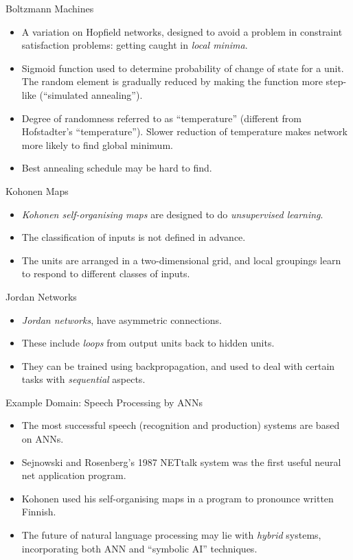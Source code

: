 \documentclass{article}
\begin{document}
\begin{slide}{}
{\Large Boltzmann Machines}
\begin{itemize}
\item A variation on Hopfield networks,
designed to avoid a problem in
constraint satisfaction problems: getting caught in {\em local 
minima}. 
\item Sigmoid function used to determine probability of change of
state for a unit. The random
element is gradually reduced by making the function more step-like
(``simulated annealing'').
\item Degree of randomness referred to as ``temperature'' (different
from Hofstadter's ``temperature''). Slower reduction of temperature
makes network more likely to find global minimum. 
\item Best annealing schedule may be hard to find.
\end{itemize}
\end{slide}

\begin{slide}{}
{\Large Kohonen Maps}
\begin{itemize}
\item {\em Kohonen self-organising maps} are designed to do {\em
unsupervised learning}.
\item The classification of inputs is not
defined in advance. 
\item The units are arranged in a two-dimensional grid,
and local groupings learn to respond to different classes of
inputs.
\end{itemize}
\end{slide}

\begin{slide}{}
{\Large Jordan Networks}
\begin{itemize}
\item {\em Jordan networks}, have asymmetric connections.
\item These
include {\em loops} from output units back to hidden units. 
\item They can
be trained using backpropagation, and used to deal with certain tasks
with {\em sequential} aspects.
\end{itemize}
\end{slide}

\begin{slide}{}
{\Large Example Domain:}
{\Large Speech Processing by ANNs}
\begin{itemize}
\item The most successful speech (recognition and production)
systems are based on ANNs.
\item Sejnowski and Rosenberg's 1987
NETtalk system was the first useful neural net application program.
\item Kohonen used his self-organising maps in a program to pronounce written
Finnish.
\item The future of natural language processing may lie with {\em
hybrid} systems, incorporating both ANN and ``symbolic AI''
techniques.
\end{itemize}
\end{slide}
\end{document}
